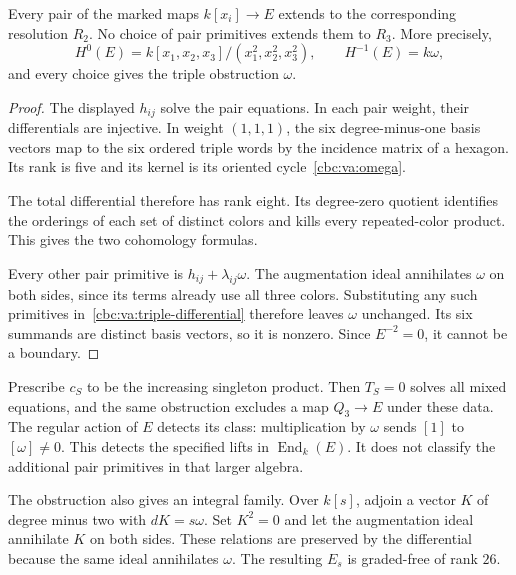 \begin{theorem}\label{cbc:va:triple-obstruction}
Every pair of the marked maps $k[x_i]\to E$
extends to the corresponding resolution $R_2$.
No choice of pair primitives extends them to
$R_3$. More precisely,
\[
 H^0(E)=k[x_1,x_2,x_3]/(x_1^2,x_2^2,x_3^2),
 \qquad H^{-1}(E)=k\omega,
\]
and every choice gives the triple obstruction
$\omega$.
\end{theorem}
\begin{proof}
The displayed $h_{ij}$ solve the pair equations.
In each pair weight, their differentials are
injective. In weight $(1,1,1)$, the six
degree-minus-one basis vectors map to the six
ordered triple words by the incidence matrix
of a hexagon. Its rank is five and its kernel
is its oriented cycle~\eqref{cbc:va:omega}.

The total differential therefore has rank eight.
Its degree-zero quotient identifies the orderings
of each set of distinct colors and kills every
repeated-color product. This gives the two
cohomology formulas.

Every other pair primitive is
$h_{ij}+\lambda_{ij}\omega$.
The augmentation ideal annihilates $\omega$
on both sides, since its terms already use all
three colors. Substituting any such primitives
in~\eqref{cbc:va:triple-differential} therefore
leaves $\omega$ unchanged.
Its six summands are distinct basis vectors,
so it is nonzero. Since $E^{-2}=0$, it cannot
be a boundary.
\end{proof}

Prescribe $c_S$ to be the increasing singleton
product. Then $T_S=0$ solves all mixed equations,
and the same obstruction excludes a map
$Q_3\to E$ under these data.
The regular action of $E$ detects its class:
multiplication by $\omega$ sends $[1]$ to
$[\omega]\ne0$. This detects the specified lifts
in $\operatorname{End}_k(E)$. It does not
classify the additional pair primitives in that
larger algebra.

The obstruction also gives an integral family.
Over $k[s]$, adjoin a vector $K$ of degree
minus two with $dK=s\omega$.
Set $K^2=0$ and let the augmentation ideal
annihilate $K$ on both sides.
These relations are preserved by the differential
because the same ideal annihilates $\omega$.
The resulting $E_s$ is graded-free of rank $26$.

